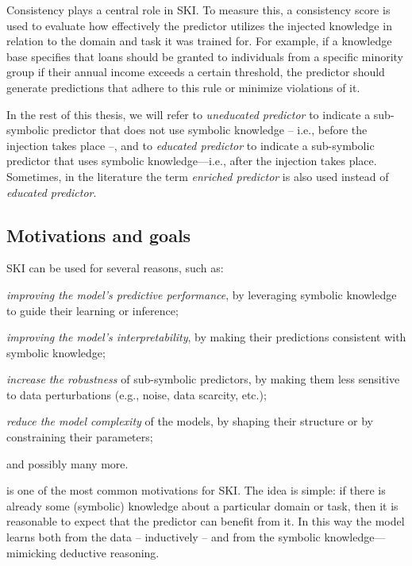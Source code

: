 Consistency plays a central role in \gls{SKI}.
%
To measure this, a consistency score is used to evaluate how effectively the predictor utilizes the injected knowledge in relation to the domain and task it was trained for.
%
For example, if a knowledge base specifies that loans should be granted to individuals from a specific minority group if their annual income exceeds a certain threshold, the predictor should generate predictions that adhere to this rule or minimize violations of it.

In the rest of this thesis, we will refer to \emph{uneducated predictor} to indicate a sub-symbolic predictor that does not use symbolic knowledge -- i.e., before the injection takes place --, and to \emph{educated predictor} to indicate a sub-symbolic predictor that uses symbolic knowledge---i.e., after the injection takes place.
%
Sometimes, in the literature the term \emph{enriched predictor} is also used instead of \emph{educated predictor}.


\subsection{Motivations and goals}\label{subsec:ski-motivations-and-goals}
%
\Gls{SKI} can be used for several reasons, such as:
%
\begin{inlinelist}
    \item \label{itm:prediction}\emph{improving the model's predictive performance}, by leveraging symbolic knowledge to guide their learning or inference;
    \item \label{itm:interpretability}\emph{improving the model's interpretability}, by making their predictions consistent with symbolic knowledge;
    \item \label{itm:robustness}\emph{increase the robustness} of sub-symbolic predictors, by making them less sensitive to data perturbations (e.g., noise, data scarcity, etc.);
    \item \label{itm:complexity}\emph{reduce the model complexity} of the models, by shaping their structure or by constraining their parameters;
    \item and possibly many more.
\end{inlinelist}


 is one of the most common motivations for \gls{SKI}.
%
The idea is simple: if there is already some (symbolic) knowledge about a particular domain or task, then it is reasonable to expect that the predictor can benefit from it.
%
In this way the model learns both from the data -- inductively -- and from the symbolic knowledge---mimicking deductive reasoning.


